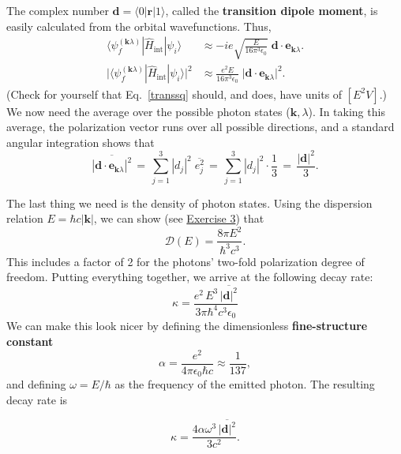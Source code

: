 \documentclass[prx,12pt]{revtex4-2}
\begin{document}
The complex number $\mathbf{d} = \langle 0 |\mathbf{r} | 1\rangle$,
called the \textbf{transition dipole moment}, is easily calculated
from the orbital wavefunctions.  Thus,
\begin{align}
  \langle \psi_{f}^{(\mathbf{k}\lambda)}| \hat{H}_{\mathrm{int}}|\psi_i\rangle
  &\approx - ie \sqrt{\frac{E}{16\pi^3\epsilon_0}}\;
  \mathbf{d}\cdot \mathbf{e}_{\mathbf{k}\lambda}. \\
  \big| \langle \psi_{f}^{(\mathbf{k}\lambda)}| \hat{H}_{\mathrm{int}}
  |\psi_i\rangle\big|^2
  &\approx \frac{e^2E}{16\pi^3\epsilon_0}\;
  \big|\mathbf{d}\cdot \mathbf{e}_{\mathbf{k}\lambda}\big|^2.
  \label{transsq}
\end{align}
(Check for yourself that Eq.~\eqref{transsq} should, and does, have
units of $[E^2V]$.)  We now need the average over the possible photon
states ($\mathbf{k}, \lambda$).  In taking this average, the
polarization vector runs over all possible directions, and a standard
angular integration shows that
\begin{equation}
  \overline{|\mathbf{d}\cdot \mathbf{e}_{\mathbf{k}\lambda}|^2}
  \,=\, \sum_{j=1}^3 |d_j|^2 \;\overline{e_j^2}
  \,=\, \sum_{j=1}^3 |d_j|^2 \cdot \frac{1}{3}
  \,=\, \frac{|\mathbf{d}|^2}{3}.
\end{equation}

The last thing we need is the density of photon states.  Using the
dispersion relation $E = \hbar c |\mathbf{k}|$, we can show (see
\hyperref[ex:DE]{Exercise 3}) that
\begin{equation}
  \mathcal{D}(E) = \frac{8\pi E^2}{\hbar^3c^3}.
  \label{DE}
\end{equation}
This includes a factor of 2 for the photons' two-fold polarization
degree of freedom.  Putting everything together, we arrive at the
following decay rate:
\begin{equation}
  \kappa = \frac{e^2\, E^3\, \overline{|\mathbf{d}|^2}}{3\pi\hbar^4c^3\epsilon_0}
\end{equation}
We can make this look nicer by defining the dimensionless
\textbf{fine-structure constant}
\begin{equation}
  \alpha = \frac{e^2}{4\pi\epsilon_0\hbar c} \approx \frac{1}{137},
  \label{alpha}
\end{equation}
and defining $\omega = E / \hbar$ as the frequency of the emitted
photon.  The resulting decay rate is
\begin{framed}
  \begin{equation}
    \kappa = \frac{4 \alpha \omega^3\, \overline{|\mathbf{d}|^2}}{3c^2}.
  \end{equation}
\end{framed}
\end{document}
